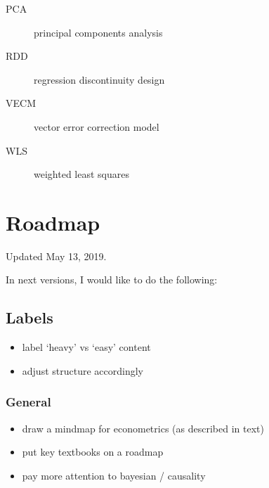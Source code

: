 \documentclass[letterpaper,10pt,english]{sphinxmanual}
\begin{document}
\begin{description}
\item[{PCA\label{\detokenize{acronyms:term-pca}}}] \leavevmode
principal components analysis

\item[{RDD\label{\detokenize{acronyms:term-rdd}}}] \leavevmode
regression discontinuity design

\item[{VECM\label{\detokenize{acronyms:term-vecm}}}] \leavevmode
vector error correction model

\item[{WLS\label{\detokenize{acronyms:term-wls}}}] \leavevmode
weighted least squares

\end{description}


\chapter{Roadmap}
\label{\detokenize{roadmap:roadmap}}\label{\detokenize{roadmap::doc}}
Updated May 13, 2019.

In next versions, I would like to do the following:


\section{Labels}
\label{\detokenize{roadmap:labels}}\begin{itemize}
\item {} 
label ‘heavy’ vs ‘easy’ content

\item {} 
adjust structure accordingly

\end{itemize}


\subsection{General}
\label{\detokenize{roadmap:general}}\begin{itemize}
\item {} 
draw a mindmap for econometrics (as described in text)

\item {} 
put key textbooks on a roadmap

\item {} 
pay more attention to bayesian / causality

\end{itemize}
\end{document}
